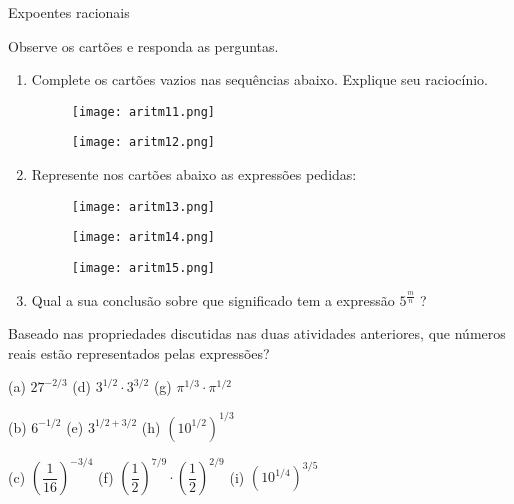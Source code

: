 \begin{task}{Expoentes racionais}

Observe os cartões e responda as perguntas.

\begin{enumerate}

\item{}
Complete os cartões vazios nas sequências abaixo. Explique seu raciocínio.

\begin{figure}[H]
\centering
\texttt{[image: aritm11.png]}
\end{figure}


\begin{figure}[H]
\centering
\texttt{[image: aritm12.png]}
\end{figure}

\item{}
Represente nos cartões abaixo as expressões pedidas:

\begin{figure}[H]
\centering
\texttt{[image: aritm13.png]}
\end{figure}

\begin{figure}[H]
\centering
\texttt{[image: aritm14.png]}
\end{figure}

\begin{figure}[H]
\centering
\texttt{[image: aritm15.png]}
\end{figure}

\item{}
Qual a sua conclusão sobre que significado tem a expressão $5^{\frac{m}{n}}$ ?

\end{enumerate}

\end{task}

\begin{reflection}

Baseado nas propriedades discutidas nas duas atividades anteriores, que números reais estão representados pelas expressões?

 (a) $27^{-2/3}$  \hspace{1,5cm} (d) $3^{1/2}\cdot 3^{3/2}$ \hspace{1,5cm} (g) $\pi^{1/3} \cdot \pi^{1/2}$

 (b) $6^{-1/2}$   \hspace{1,7cm} (e) $3^{1/2+3/2}$  \hspace{1,7cm} (h) $(10^{1/2})^{1/3}$

 (c) $\left( \dfrac{1}{16}\right)^{-3/4}$  \hspace{1,0cm} (f) $\left( \dfrac{1}{2}\right)^{7/9} \cdot \left( \dfrac{1}{2}\right)^{2/9}$  \hspace{0,3cm} (i) $(10^{1/4})^{3/5}$

\end{reflection}

